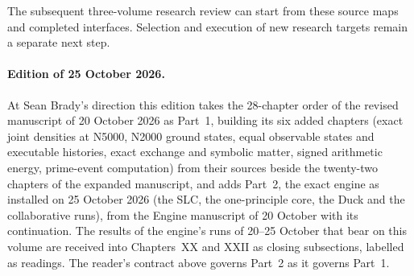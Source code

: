 The subsequent three-volume research review can start from these source maps and completed interfaces. Selection and execution of new research targets remain a separate next step.

\paragraph*{Edition of 25 October 2026.} At Sean Brady's direction this edition takes the 28-chapter order of the revised manuscript of 20 October 2026 as Part~1, building its six added chapters (exact joint densities at N5000, N2000 ground states, equal observable states and executable histories, exact exchange and symbolic matter, signed arithmetic energy, prime-event computation) from their sources beside the twenty-two chapters of the expanded manuscript, and adds Part~2, the exact engine as installed on 25 October 2026 (the SLC, the one-principle core, the Duck and the collaborative runs), from the Engine manuscript of 20 October with its continuation. The results of the engine's runs of 20--25 October that bear on this volume are received into Chapters~XX and XXII as closing subsections, labelled as readings. The reader's contract above governs Part~2 as it governs Part~1.
